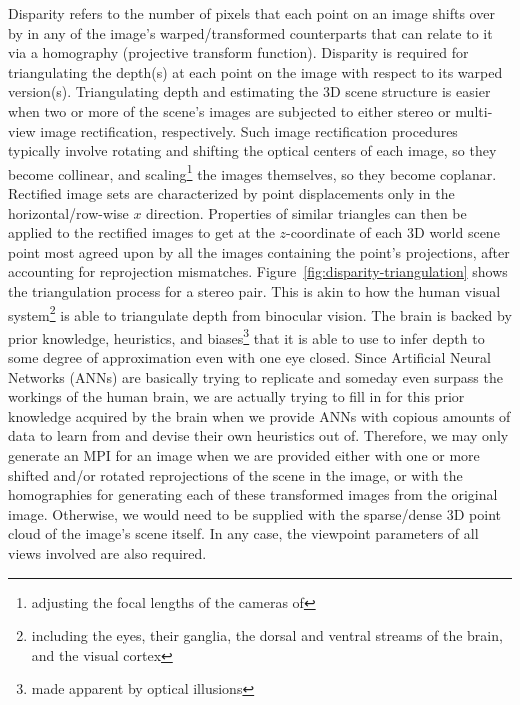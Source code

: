 Disparity refers to the number of pixels that each point on an image shifts over by in any of the image's warped/transformed counterparts that can relate to it via a homography (projective transform function). Disparity is required for triangulating the depth(s) at each point on the image with respect to its warped version(s). Triangulating depth and estimating the 3D scene structure is easier when two or more of the scene's images are subjected to either stereo or multi-view image rectification, respectively. Such image rectification procedures typically involve rotating and shifting the optical centers of each image, so they become collinear, and scaling\footnote{adjusting the focal lengths of the cameras of} the images themselves, so they become coplanar. Rectified image sets are characterized by point displacements only in the horizontal/row-wise $x$ direction. Properties of similar triangles can then be applied to the rectified images to get at the $z$-coordinate of each 3D world scene point most agreed upon by all the images containing the point's projections, after accounting for reprojection mismatches. Figure~\ref{fig:disparity-triangulation} shows the triangulation process for a stereo pair. This is akin to how the human visual system\footnote{including the eyes, their ganglia, the dorsal and ventral streams of the brain, and the visual cortex} is able to triangulate depth from binocular vision. The brain is backed by prior knowledge, heuristics, and biases\footnote{made apparent by optical illusions} that it is able to use to infer depth to some degree of approximation even with one eye closed. Since Artificial Neural Networks (ANNs) are basically trying to replicate and someday even surpass the workings of the human brain, we are actually trying to fill in for this prior knowledge acquired by the brain when we provide ANNs with copious amounts of data to learn from and devise their own heuristics out of. Therefore, we may only generate an MPI for an image when we are provided either with one or more shifted and/or rotated reprojections of the scene in the image, or with the homographies for generating each of these transformed images from the original image. Otherwise, we would need to be supplied with the sparse/dense 3D point cloud of the image's scene itself. In any case, the viewpoint parameters of all views involved are also required.


